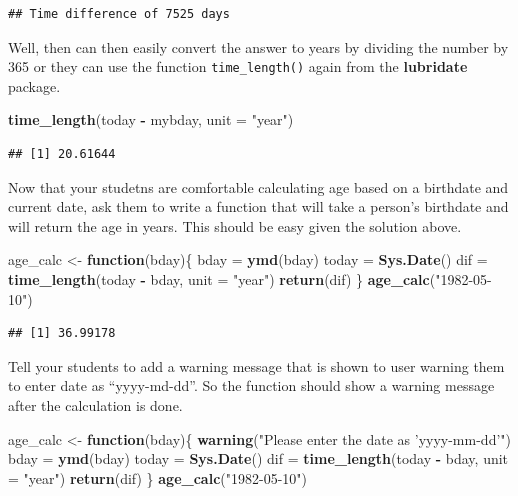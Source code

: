 \documentclass[]{book}
\newenvironment{Shaded}{\begin{snugshade}}{\end{snugshade}}
\newcommand{\ControlFlowTok}[1]{\textcolor[rgb]{0.13,0.29,0.53}{\textbf{#1}}}
\newcommand{\DataTypeTok}[1]{\textcolor[rgb]{0.13,0.29,0.53}{#1}}
\newcommand{\KeywordTok}[1]{\textcolor[rgb]{0.13,0.29,0.53}{\textbf{#1}}}
\newcommand{\NormalTok}[1]{#1}
\newcommand{\OperatorTok}[1]{\textcolor[rgb]{0.81,0.36,0.00}{\textbf{#1}}}
\newcommand{\StringTok}[1]{\textcolor[rgb]{0.31,0.60,0.02}{#1}}
\begin{document}
\begin{verbatim}
## Time difference of 7525 days
\end{verbatim}

Well, then can then easily convert the answer to years by dividing the number by 365 or they can use the function \texttt{time\_length()} again from the \textbf{lubridate} package.

\begin{Shaded}
\begin{Highlighting}[]
\KeywordTok{time_length}\NormalTok{(today }\OperatorTok{-}\StringTok{ }\NormalTok{mybday, }\DataTypeTok{unit =} \StringTok{"year"}\NormalTok{)}
\end{Highlighting}
\end{Shaded}

\begin{verbatim}
## [1] 20.61644
\end{verbatim}

Now that your studetns are comfortable calculating age based on a birthdate and current date, ask them to write a function that will take a person's birthdate and will return the age in years. This should be easy given the solution above.

\begin{Shaded}
\begin{Highlighting}[]
\NormalTok{age_calc <-}\StringTok{ }\ControlFlowTok{function}\NormalTok{(bday)\{}
\NormalTok{    bday =}\StringTok{ }\KeywordTok{ymd}\NormalTok{(bday)}
\NormalTok{    today =}\StringTok{ }\KeywordTok{Sys.Date}\NormalTok{()}
\NormalTok{    dif =}\StringTok{ }\KeywordTok{time_length}\NormalTok{(today }\OperatorTok{-}\StringTok{ }\NormalTok{bday, }\DataTypeTok{unit =} \StringTok{"year"}\NormalTok{)}
    \KeywordTok{return}\NormalTok{(dif)}
\NormalTok{\}}
\KeywordTok{age_calc}\NormalTok{(}\StringTok{"1982-05-10"}\NormalTok{)}
\end{Highlighting}
\end{Shaded}

\begin{verbatim}
## [1] 36.99178
\end{verbatim}

Tell your students to add a warning message that is shown to user warning them to enter date as ``yyyy-md-dd''. So the function should show a warning message after the calculation is done.

\begin{Shaded}
\begin{Highlighting}[]
\NormalTok{age_calc <-}\StringTok{ }\ControlFlowTok{function}\NormalTok{(bday)\{}
    \KeywordTok{warning}\NormalTok{(}\StringTok{"Please enter the date as 'yyyy-mm-dd'"}\NormalTok{)}
\NormalTok{    bday =}\StringTok{ }\KeywordTok{ymd}\NormalTok{(bday)}
\NormalTok{    today =}\StringTok{ }\KeywordTok{Sys.Date}\NormalTok{()}
\NormalTok{    dif =}\StringTok{ }\KeywordTok{time_length}\NormalTok{(today }\OperatorTok{-}\StringTok{ }\NormalTok{bday, }\DataTypeTok{unit =} \StringTok{"year"}\NormalTok{)}
    \KeywordTok{return}\NormalTok{(dif)}
\NormalTok{\}}
\KeywordTok{age_calc}\NormalTok{(}\StringTok{"1982-05-10"}\NormalTok{)}
\end{Highlighting}
\end{Shaded}
\end{document}
